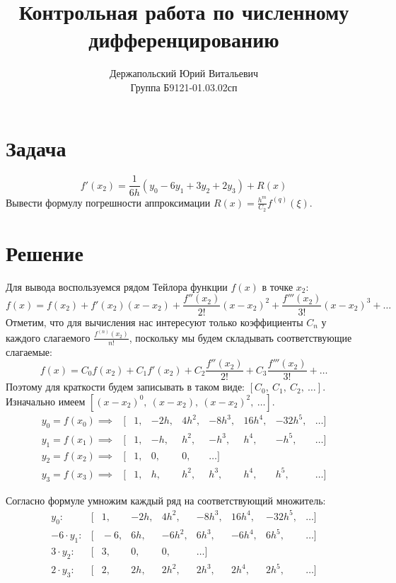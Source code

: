 \documentclass[14pt, a4paper, titlepage, fleqn]{extarticle}
\title{Контрольная работа по численному дифференцированию}
\author{Держапольский Юрий Витальевич \\ Группа Б9121-01.03.02сп}
\date{}
\begin{document}
    \maketitle

    \section*{Задача}
        \[
            f' (x_2) = \frac{1}{6h}(y_0 - 6y_1 + 3y_2 + 2y_3) + R(x)
        \]
        Вывести формулу погрешности аппроксимации
        \( \displaystyle R(x) = \frac{h^m}{C_2} f^{(q)} \left( \xi \right) \).
        
    \section*{Решение}
        Для вывода воспользуемся рядом Тейлора функции \( f(x) \) в точке \( x_2 \):
        \[
            f(x) = f(x_2) + f'(x_2)(x-x_2) + \frac{f''(x_2)}{2!} (x-x_2)^2 + \frac{f'''(x_2)}{3!} (x-x_2)^3 + \dots
        \]
        Отметим, что для вычисления нас интересуют только коэффициенты \( C_n \) у каждого слагаемого 
        \( \displaystyle \frac{f^{(n)}(x_2)}{n!} \), поскольку мы будем складывать соответствующие слагаемые:
        \[
            f(x) = C_0 f(x_2) + C_1 f'(x_2) + C_2 \frac{f''(x_2)}{2!} + C_3 \frac{f'''(x_2)}{3!} + \dots
        \]
        Поэтому для краткости будем записывать в таком виде: \( \left[C_0, ~ C_1, ~ C_2, ~ \dots \right] \). 
        \\
        
        Изначально имеем \( \left[(x-x_2)^0, ~ (x-x_2), ~ (x-x_2)^2, ~ \dots \right] \).
        \[ 
            \begin{matrix}
                y_0 = f(x_0) \implies & [&1, & -2h, & 4h^2, & -8h^3, & 16h^4, & -32h^5, & \dots ] \\
                y_1 = f(x_1) \implies & [&1, & -h, & h^2, & -h^3, & h^4, & -h^5, & \dots ] \\
                y_2 = f(x_2) \implies & [&1, & 0, & 0, & \dots ]  \\
                y_3 = f(x_3) \implies & [&1, & h, & h^2, & h^3, & h^4, &  h^5, & \dots ] 
            \end{matrix}
        \]
        

        Согласно формуле умножим каждый ряд на соответствующий множитель:
        \[
            \begin{matrix}
                y_0: &[& \! 1, & -2h, & 4h^2, & -8h^3, & 16h^4, & -32h^5, & \dots ]  \\
                -6 \cdot y_1: &[& \! -6, & 6h, & -6h^2, & 6h^3, & -6h^4, & 6h^5, & \dots ] \\
                3 \cdot y_2: &[& \! 3, & 0, & 0, & \dots ] \\
                2 \cdot y_3: &[& \! 2, & 2h, & 2h^2, & 2h^3, & 2h^4, & 2h^5, & \dots ]
            \end{matrix}
        \]
\end{document}
